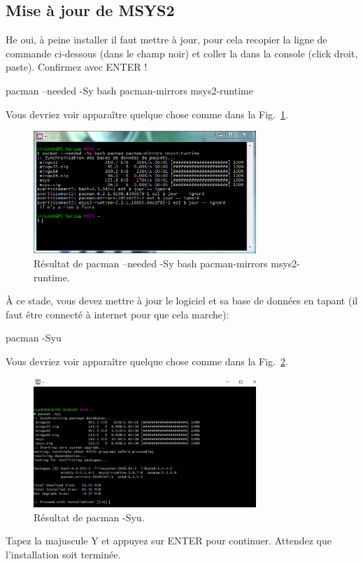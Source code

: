 \documentclass{article}
\newcommand\fig[1]{{Fig.~\ref{#1}}}
\begin{document}
\subsection{Mise à jour de MSYS2}
He oui, à peine installer il faut mettre à jour, pour cela recopier la ligne de commande ci-dessous (dans le champ noir) et coller la dans la console (click droit, paste). Confirmez avec ENTER !
\begin{tcolorbox}[width=\textwidth,colframe=Purple,colback={black},title={Ceci est la console MSYS2 Shell},outer arc=0mm,colupper=white]    
      pacman --needed -Sy bash pacman-mirrors msys2-runtime
\end{tcolorbox}
Vous devriez voir apparaître quelque chose comme dans la \fig{F:firstPaxman}.
\begin{figure}[H]
\center
\includegraphics[width=0.75\textwidth]{Plots/Msys2_7Terminal.png}
\caption{Résultat de pacman --needed -Sy bash pacman-mirrors msys2-runtime.\label{F:firstPaxman}}
\end{figure}
À ce stade, vous devez mettre à jour le logiciel et sa base de données en tapant (il faut être connecté à internet pour que cela marche):
\begin{tcolorbox}[width=\textwidth,colframe=Purple,colback={black},title={Ceci est la console MSYS2 Shell},outer arc=0mm,colupper=white]    
      pacman -Syu
\end{tcolorbox}
Vous devriez voir apparaître quelque chose comme dans la \fig{F:2Paxman}.
\begin{figure}[H]
\center
\includegraphics[width=0.75\textwidth]{Plots/Msys2_8Terminal.jpeg}
\caption{Résultat de pacman -Syu.\label{F:2Paxman}}
\end{figure}
Tapez la majuscule Y et appuyez sur ENTER pour continuer. Attendez que l'installation soit terminée. 
\end{document}
